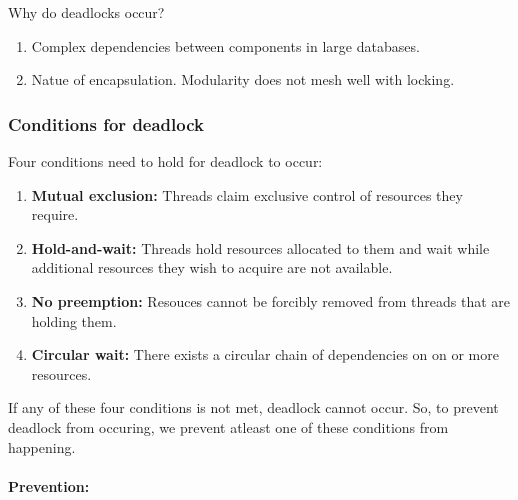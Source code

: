 Why do deadlocks occur?

\begin{enumerate}
    \item Complex dependencies between components in large databases. 
    \item Natue of encapsulation. Modularity does not mesh well with locking.
\end{enumerate}

\subsubsection{Conditions for deadlock}

Four conditions need to hold for deadlock to occur:

\begin{enumerate}
    \item \textbf{Mutual exclusion:} Threads claim exclusive control of resources
        they require.
    \item \textbf{Hold-and-wait:} Threads hold resources allocated to them
        and wait while additional resources they wish to acquire are not available.
    \item \textbf{No preemption:} Resouces cannot be forcibly removed from
        threads that are holding them.
    \item \textbf{Circular wait:} There exists a circular chain of dependencies
        on on or more resources.
\end{enumerate}

If any of these four conditions is not met, deadlock cannot occur. So, to prevent
deadlock from occuring, we prevent atleast one of these conditions from happening.

\paragraph{Prevention:}

